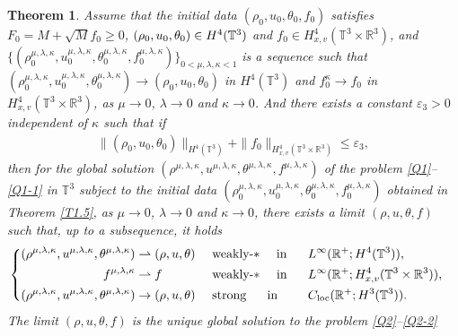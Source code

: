 \documentclass[reqno,11pt]{amsart}
\theoremstyle{plain}
\newtheorem{thm}{Theorem}[section]
\numberwithin{equation}{section}
\newcommand{\eps}{{\varepsilon}}
\begin{document}
\begin{thm}\label{T1.6}
Assume that the initial data $(\rho_0 ,u_0 ,\theta_0,f_0)$
satisfies $F_0=M+\sqrt{M}f_0\geq 0$, $(\rho_0,u_0,\theta_0)\linebreak \in H^4(\mathbb{T}^3)$
and $f_0\in H_{x,v}^4(\mathbb{T}^3\times\mathbb{R}^3)$, and 
$\{(\rho_0^{\mu,\lambda,\kappa},u_0^{\mu,\lambda,\kappa},
\theta_0^{\mu,\lambda,\kappa},f_0^{\mu,\lambda,\kappa})\}_{0<\mu,\lambda,\kappa<1}$ is
a sequence such that $(\rho^{\mu,\lambda,\kappa}_0,u^{\mu,\lambda,
\kappa}_0,\theta^{\mu,\lambda,\kappa}_0)\rightarrow (\rho_0,u_0,
\theta_0)$ in $H^4(\mathbb{T}^3)$ and $f_0^\kappa\rightarrow f_0$ in
$H^4_{x,v}(\mathbb{T}^3\times\mathbb{R}^3)$, as $\mu\rightarrow0$, 
$\lambda\rightarrow0$ 
and $\kappa \rightarrow 0$. And there exists a constant $\eps_3>0$
independent of $\kappa$ such that if 
\begin{align*}
\|(\rho _0,u _0,\theta _0 )\|_{H^4(\mathbb{T}^3)} +\|f_0 \|_{H_{x,v}^4(\mathbb{T}^3\times\mathbb{R}^3)} \leq   \eps_3, 
\end{align*}
then for the global solution $(\rho^{\mu,\lambda,\kappa},u^{\mu,\lambda,\kappa},
\theta^{\mu,\lambda,\kappa},f^{\mu,\lambda,\kappa})$ of the   problem 
\eqref{Q1}--\eqref{Q1-1} in $\mathbb{T}^3 $ subject to the initial data 
 $(\rho_0^{\mu,\lambda,\kappa},u_0^{\mu,\lambda,\kappa},\theta_0^{\mu,\lambda,\kappa},f_0^{\mu,\lambda,\kappa})$ 
 obtained in Theorem \ref{T1.5}, as $\mu\rightarrow 0$, $\lambda\rightarrow0$ and $\kappa\rightarrow 0$, 
 there exists a limit $(\rho,u,\theta,f)$ such that, up to a subsequence, it holds 
\begin{equation*} 
\left\{
\begin{aligned}
(\rho^{\mu,\lambda,\kappa},u^{\mu,\lambda,\kappa},\theta^{\mu,\lambda,\kappa} )
 &\rightharpoonup (\rho,u,\theta )\quad  \,\, \text{weakly-$*$~ ~~in\ \ } 
 &&L^{\infty}(\mathbb{R}^{+};H^4(\mathbb{T}^3)),& \\
f^{\mu,\lambda,\kappa} &\rightharpoonup  f\quad  \,\, \quad\quad\,\,\,\, 
\text{weakly-$*$~ ~~in \   } &&L^{\infty}(\mathbb{R}^{+};H_{x,v}^4(\mathbb{T}^3\times \mathbb{R}^3)),& \\
(\rho^{\mu,\lambda,\kappa},u^{\mu,\lambda,\kappa},\theta^{\mu,\lambda,\kappa} ) 
&\rightarrow (\rho,u,\theta )\quad  \,\, \text{strong~ ~~   in \ \ } 
&&C_{\rm{loc}}(\mathbb{R}^{+};H^3(\mathbb{T}^3)).&
\end{aligned}
\right.
\end{equation*}
 The limit $(\rho,u,\theta,f)$ is the unique global solution to the   problem \eqref{Q2}--\eqref{Q2-2} 

\end{thm}
\end{document}
